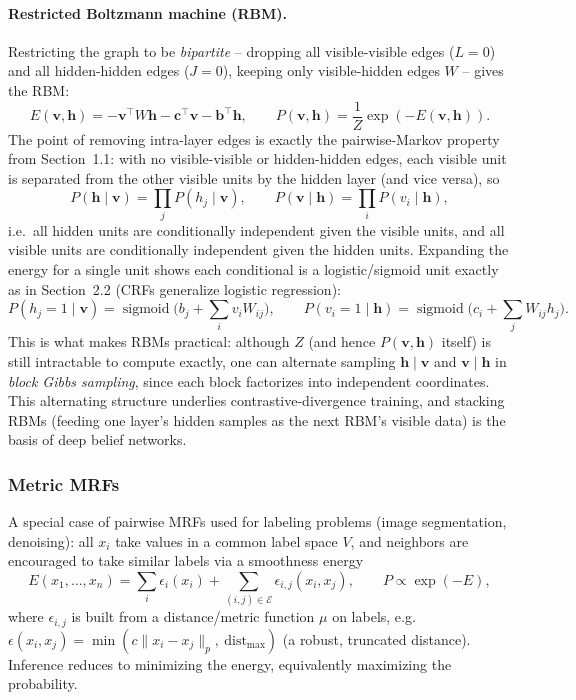 \documentclass[11pt]{article}
\begin{document}
\paragraph{Restricted Boltzmann machine (RBM).} Restricting the graph to be
\emph{bipartite} -- dropping all visible-visible edges ($L=0$) and all
hidden-hidden edges ($J=0$), keeping only visible-hidden edges $W$ -- gives
the RBM:
\[
E(\mathbf{v},\mathbf{h}) = -\mathbf{v}^\top W \mathbf{h} - \mathbf{c}^\top
\mathbf{v} - \mathbf{b}^\top \mathbf{h}, \qquad
P(\mathbf{v},\mathbf{h}) = \frac{1}{Z}\exp(-E(\mathbf{v},\mathbf{h})).
\]
The point of removing intra-layer edges is exactly the pairwise-Markov
property from Section~1.1: with no visible-visible or hidden-hidden edges,
each visible unit is separated from the other visible units by the hidden
layer (and vice versa), so
\[
P(\mathbf{h}\mid\mathbf{v}) = \prod_j P(h_j \mid \mathbf{v}), \qquad
P(\mathbf{v}\mid\mathbf{h}) = \prod_i P(v_i \mid \mathbf{h}),
\]
i.e.\ all hidden units are conditionally independent given the visible
units, and all visible units are conditionally independent given the
hidden units. Expanding the energy for a single unit shows each conditional
is a logistic/sigmoid unit exactly as in Section~2.2 (CRFs generalize
logistic regression):
\[
P(h_j = 1 \mid \mathbf{v}) = \operatorname{sigmoid}\Big(b_j + \sum_i v_i W_{ij}\Big),
\qquad
P(v_i = 1 \mid \mathbf{h}) = \operatorname{sigmoid}\Big(c_i + \sum_j W_{ij} h_j\Big).
\]
This is what makes RBMs practical: although $Z$ (and hence
$P(\mathbf{v},\mathbf{h})$ itself) is still intractable to compute exactly,
one can alternate sampling $\mathbf{h}\mid\mathbf{v}$ and
$\mathbf{v}\mid\mathbf{h}$ in \emph{block Gibbs sampling}, since each block
factorizes into independent coordinates. This alternating structure
underlies contrastive-divergence training, and stacking RBMs (feeding one
layer's hidden samples as the next RBM's visible data) is the basis of deep
belief networks.

\subsubsection{Metric MRFs}

A special case of pairwise MRFs used for labeling problems (image
segmentation, denoising): all $x_i$ take values in a common label space
$V$, and neighbors are encouraged to take similar labels via a smoothness
energy
\[
E(x_1,\dots,x_n) = \sum_i \epsilon_i(x_i) + \sum_{(i,j)\in\mathcal{E}} \epsilon_{i,j}(x_i,x_j),
\qquad P \propto \exp(-E),
\]
where $\epsilon_{i,j}$ is built from a distance/metric function $\mu$ on
labels, e.g. $\epsilon(x_i,x_j) = \min(c\|x_i-x_j\|_p,\ \mathrm{dist}_{\max})$
(a robust, truncated distance). Inference reduces to minimizing the energy,
equivalently maximizing the probability.
\end{document}
